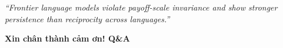 \documentclass[aspectratio=169,9pt]{beamer}
\begin{document}
\begin{frame}[plain]
\begin{center}
\vspace{0.4cm}
\begin{mdframed}[
  linecolor=maccent, linewidth=1.5pt,
  backgroundcolor=mlightgold,
  innertopmargin=6pt, innerbottommargin=6pt,
  roundcorner=3pt, skipabove=0pt, skipbelow=0pt
]
\centering\itshape\small\color{mprimary}
“Frontier language models violate payoff-scale invariance and show stronger persistence than reciprocity across languages.”
\end{mdframed}

\vspace{0.3cm}
{\large\bfseries\color{mprimary} Xin chân thành cảm ơn! \quad Q\&A}
\end{center}
\end{frame}
\end{document}
